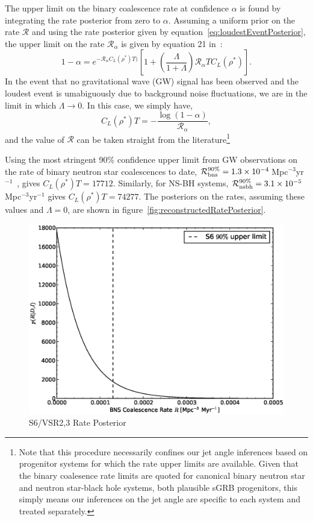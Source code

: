 \documentclass[twocolumn,nofootinbib]{revtex4-1}
\newcommand{\cbcrate}{{{\mathcal R}}}
\newcommand{\rhostar}{{\rho^*}}
\def\gw#1{gravitational wave#1 (GW#1)\gdef\gw{GW}}
\begin{document}
The upper limit on the binary coalescence rate at confidence $\alpha$ is found
by integrating the rate posterior from zero to $\alpha$.  Assuming a uniform
prior on the rate $\cbcrate$ and using the rate posterior given by
equation~\ref{eq:loudestEventPosterior}, the upper limit on the rate
$\cbcrate_{\alpha}$ is given by equation 21 in~\cite{BradyFairhurst08}:
%
\begin{equation}
1-\alpha =  e^{-\cbcrate_{\alpha} C_L(\rhostar)T)}
\left[ 
1+ \left(\frac{\Lambda}{1+\Lambda}\right) \cbcrate_{\alpha} T C_L(\rhostar)
\right ].
\label{eq:rateIntegral}
\end{equation}
%
In the event that no \gw{} signal has been observed and the loudest event is
umabiguously due to background noise fluctuations, we are in the limit in which
$\Lambda \rightarrow 0$.  In this case, we simply have,
\begin{equation}
C_L(\rhostar)T = -\frac{\log(1-\alpha)}{\cbcrate_{\alpha}},
\end{equation}
%
and the value of $\cbcrate$ can be taken straight from the literature\footnote{Note
that this procedure necessarily confines our jet angle inferences based on
progenitor systems for which the rate upper limits are available.  Given that
the binary coalesence rate limits are quoted for canonical binary neutron star
and neutron star-black hole systems, both plausible sGRB progenitors, this
simply means our inferences on the jet angle are specific to each system and
treated separately.}

Using the most stringent 90\% confidence upper limit from \gw{} observations on
the rate of binary neutron star coalescences to date, $\cbcrate^{90\%}_{{\rm
bns}} = 1.3\times 10^{-4}$\,Mpc$^{-3}$yr$^{-1}$~\cite{S6lowmass}, gives
$C_L(\rhostar)T=17712$.  Similarly, for NS-BH systems,  $\cbcrate^{90\%}_{{\rm
nsbh}} = 3.1\times 10^{-5}$\,Mpc$^{-3}$yr$^{-1}$ gives $C_L(\rhostar)T=74277$.
The posteriors on the rates, assuming these values and $\Lambda=0$, are shown in
figure~\ref{fig:reconstructedRatePosterior}.  

\begin{figure}
\centering
\includegraphics[width=\linewidth]{S6_rate.eps}
\caption{S6/VSR2,3 Rate Posterior\label{fig:s6rate}}
\end{figure}
\end{document}
